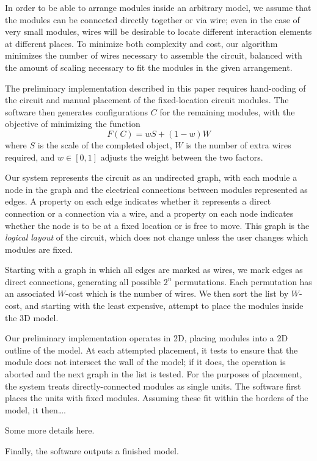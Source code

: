 \documentclass{chi-ext}
\begin{document}
	In order to be able to arrange modules inside an arbitrary model, we
	assume that the modules can be connected directly together or via
	wire; even in the case of very small modules, wires will be
	desirable to locate different interaction elements at different
	places. To minimize both complexity and cost, our algorithm
	minimizes the number of wires necessary to assemble the circuit,
	balanced with the amount of scaling necessary to fit the modules in
	the given arrangement.

	The preliminary implementation described in this paper requires
	hand-coding of the circuit and manual placement of the
	fixed-location circuit modules. The software then generates
	configurations $C$ for the remaining modules, with the objective of
	minimizing the function
	\[
		F(C) = wS + (1-w)W
	\]
	where $S$ is the scale of the completed object, $W$ is the number of
	extra wires required, and $w \in [0,1]$ adjusts the weight between
	the two factors.

	Our system represents the circuit as an undirected graph, with each
	module a node in the graph and the electrical connections between
	modules represented as edges. A property on each edge indicates
	whether it represents a direct connection or a connection via a
	wire, and a property on each node indicates whether the node is
	to be at a fixed location or is free to move. This graph is the
	\textit{logical layout} of the circuit, which does not change unless
	the user changes which modules are fixed.

	Starting with a graph in which all edges are marked as wires, we
	mark edges as direct connections, generating all possible $2^n$
	permutations. Each permutation has an associated $W$-cost which is
	the number of wires. We then sort the list by $W$-cost, and starting
	with the least expensive, attempt to place the modules inside the 3D
	model.

	Our preliminary implementation operates in 2D, placing modules into
	a 2D outline of the model. At each attempted placement, it tests to
	ensure that the module does not intersect the wall of the model; if
	it does, the operation is aborted and the next graph in the list is
	tested. For the purposes of placement, the system treats
	directly-connected modules as single units. The software first
	places the units with fixed modules. Assuming these fit within the
	borders of the model, it then\ldots {}.
	
	Some more details here.

	Finally, the software outputs a finished model.





\balance


\end{document}
